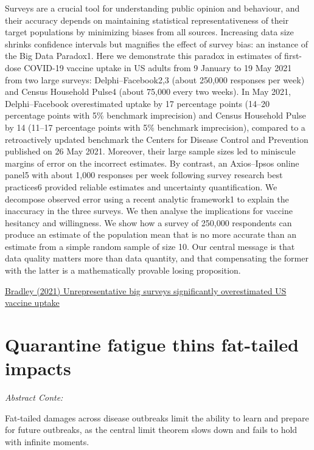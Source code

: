 \documentclass[
]{book}
\begin{document}
Surveys are a crucial tool for understanding public opinion and behaviour, and their accuracy depends on maintaining statistical representativeness of their target populations by minimizing biases from all sources. Increasing data size shrinks confidence intervals but magnifies the effect of survey bias: an instance of the Big Data Paradox1. Here we demonstrate this paradox in estimates of first-dose COVID-19 vaccine uptake in US adults from 9 January to 19 May 2021 from two large surveys: Delphi--Facebook2,3 (about 250,000 responses per week) and Census Household Pulse4 (about 75,000 every two weeks). In May 2021, Delphi--Facebook overestimated uptake by 17 percentage points (14--20 percentage points with 5\% benchmark imprecision) and Census Household Pulse by 14 (11--17 percentage points with 5\% benchmark imprecision), compared to a retroactively updated benchmark the Centers for Disease Control and Prevention published on 26 May 2021. Moreover, their large sample sizes led to miniscule margins of error on the incorrect estimates. By contrast, an Axios--Ipsos online panel5 with about 1,000 responses per week following survey research best practices6 provided reliable estimates and uncertainty quantification. We decompose observed error using a recent analytic framework1 to explain the inaccuracy in the three surveys. We then analyse the implications for vaccine hesitancy and willingness. We show how a survey of 250,000 respondents can produce an estimate of the population mean that is no more accurate than an estimate from a simple random sample of size 10. Our central message is that data quality matters more than data quantity, and that compensating the former with the latter is a mathematically provable losing proposition.

\href{https://www.nature.com/articles/s41586-021-04198-4}{Bradley (2021) Unrepresentative big surveys significantly overestimated US vaccine uptake}

\hypertarget{quarantine-fatigue-thins-fat-tailed-impacts}{%
\section{Quarantine fatigue thins fat-tailed impacts}\label{quarantine-fatigue-thins-fat-tailed-impacts}}

\emph{Abstract Conte:}

Fat-tailed damages across disease outbreaks limit the
ability to learn and prepare for future outbreaks,
as the central limit theorem slows down and fails
to hold with infinite moments.
\end{document}
